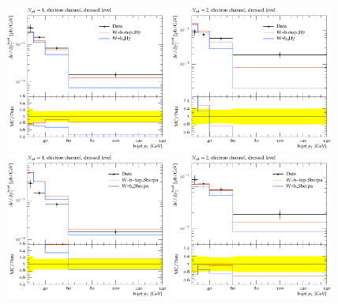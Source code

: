 \documentclass[11pt]{cernrep}
\begin{document}
\begin{figure}
\centering
	\includegraphics[width=0.48\textwidth]{unsubtracted-h7-1jet.pdf}
	\includegraphics[width=0.48\textwidth]{unsubtracted-h7-2jet.pdf}
	\includegraphics[width=0.48\textwidth]{unsubtracted-s22-1jet.pdf}
	\includegraphics[width=0.48\textwidth]{unsubtracted-s22-2jet.pdf}

\end{figure}
\end{document}
